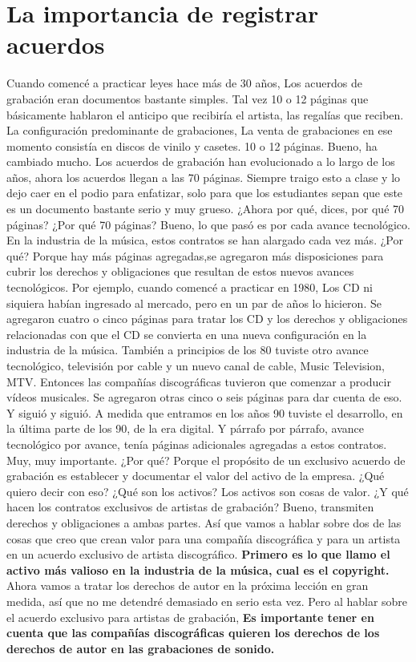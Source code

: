 \documentclass[10pt]{book}
\begin{document}
\section{La importancia de registrar acuerdos}
Cuando comencé a practicar leyes hace más de 30 años, Los acuerdos de grabación eran documentos bastante simples. Tal vez 10 o 12 páginas que básicamente hablaron el anticipo que recibiría el artista, las regalías que reciben. La configuración predominante de grabaciones, La venta de grabaciones en ese momento consistía en discos de vinilo y casetes. 10 o 12 páginas. Bueno, ha cambiado mucho. Los acuerdos de grabación han evolucionado a lo largo de los años, ahora los acuerdos llegan a las 70 páginas. Siempre traigo esto a clase y lo dejo caer en el podio para enfatizar, solo para que los estudiantes sepan que este es un documento bastante serio y muy grueso. ¿Ahora por qué, dices, por qué 70 páginas? ¿Por qué 70 páginas? Bueno, lo que pasó es por cada avance tecnológico. En la industria de la música, estos contratos se han alargado cada vez más. ¿Por qué? Porque hay más páginas agregadas,se agregaron más disposiciones para cubrir los derechos y obligaciones que resultan de estos nuevos avances tecnológicos. Por ejemplo, cuando comencé a practicar en 1980, Los CD ni siquiera habían ingresado al mercado, pero en un par de años lo hicieron. Se agregaron cuatro o cinco páginas para tratar los CD y los derechos y obligaciones relacionadas con que el CD se convierta en una nueva configuración en la industria de la música. También a principios de los 80 tuviste otro avance tecnológico, televisión por cable y un nuevo canal de cable, Music Television, MTV.
Entonces las compañías discográficas tuvieron que comenzar a producir vídeos musicales. Se agregaron otras cinco o seis páginas para dar cuenta de eso. Y siguió y siguió. A medida que entramos en los años 90 tuviste el desarrollo, en la última parte de los 90, de la era digital. Y párrafo por párrafo, avance tecnológico por avance, tenía páginas adicionales agregadas a estos contratos.\\
Muy, muy importante. ¿Por qué? Porque el propósito de un exclusivo acuerdo de grabación es establecer y documentar el valor del activo de la empresa. ¿Qué quiero decir con eso? ¿Qué son los activos? Los activos son cosas de valor. ¿Y qué hacen los contratos exclusivos de artistas de grabación? Bueno, transmiten derechos y obligaciones a ambas partes. Así que vamos a hablar sobre dos de las cosas que creo que crean valor para una compañía discográfica y para un artista en un acuerdo exclusivo de artista discográfico. \textbf{Primero es lo que llamo el activo más valioso en la industria de la música, cual es el copyright.} Ahora vamos a tratar los derechos de autor en la próxima lección en gran medida, así que no me detendré demasiado en serio esta vez. Pero al hablar sobre el acuerdo exclusivo para artistas de grabación, \textbf{Es importante tener en cuenta que las compañías discográficas quieren los derechos de los derechos de autor en las grabaciones de sonido.} \\
\end{document}
